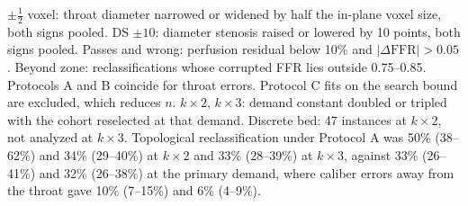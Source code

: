 \documentclass[journal,twoside,web,onecolumn]{ieeecolor}
\begin{document}
\begin{table}[!ht]
\parbox{0.95\textwidth}{\footnotesize $\pm\tfrac12$ voxel: throat diameter narrowed or widened by half the in-plane voxel size, both signs pooled. DS $\pm10$: diameter stenosis raised or lowered by 10 points, both signs pooled. Passes and wrong: perfusion residual below 10\% and $|\Delta\mathrm{FFR}| > 0.05$. Beyond zone: reclassifications whose corrupted FFR lies outside 0.75--0.85. Protocols A and B coincide for throat errors. Protocol C fits on the search bound are excluded, which reduces $n$. $k\times2$, $k\times3$: demand constant doubled or tripled with the cohort reselected at that demand. Discrete bed: 47 instances at $k\times2$, not analyzed at $k\times3$. Topological reclassification under Protocol A was 50\% (38--62\%) and 34\% (29--40\%) at $k\times2$ and 33\% (28--39\%) at $k\times3$, against 33\% (26--41\%) and 32\% (26--38\%) at the primary demand, where caliber errors away from the throat gave 10\% (7--15\%) and 6\% (4--9\%).}
\end{table}

\FloatBarrier
{}
\end{document}
